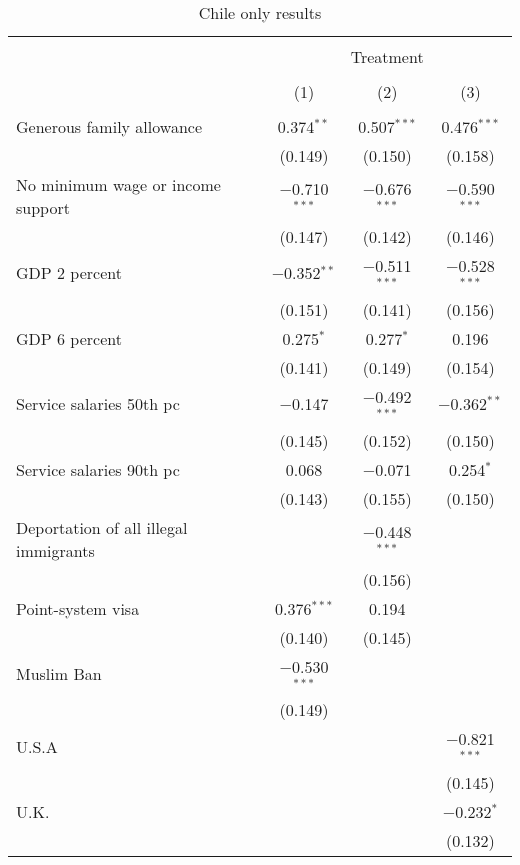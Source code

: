 
\begin{table}[!htbp] \centering 
  \caption{Chile only results} 
  \label{tab:chile} 
\begin{tabular}{@{\extracolsep{5pt}}lccc} 
\\[-1.8ex]\hline 
\hline \\[-1.8ex] 
 & \multicolumn{3}{c}{Treatment} \\ 
\cline{2-4} 
\\[-1.8ex] & (1) & (2) & (3)\\ 
\hline \\[-1.8ex] 
 Generous family allowance & 0.374$^{**}$ & 0.507$^{***}$ & 0.476$^{***}$ \\ 
  & (0.149) & (0.150) & (0.158) \\ 
  No minimum wage or income support & $-$0.710$^{***}$ & $-$0.676$^{***}$ & $-$0.590$^{***}$ \\ 
  & (0.147) & (0.142) & (0.146) \\ 
  GDP 2 percent & $-$0.352$^{**}$ & $-$0.511$^{***}$ & $-$0.528$^{***}$ \\ 
  & (0.151) & (0.141) & (0.156) \\ 
  GDP 6 percent & 0.275$^{*}$ & 0.277$^{*}$ & 0.196 \\ 
  & (0.141) & (0.149) & (0.154) \\ 
  Service salaries 50th pc & $-$0.147 & $-$0.492$^{***}$ & $-$0.362$^{**}$ \\ 
  & (0.145) & (0.152) & (0.150) \\ 
  Service salaries 90th pc & 0.068 & $-$0.071 & 0.254$^{*}$ \\ 
  & (0.143) & (0.155) & (0.150) \\ 
  Deportation of all illegal immigrants &  & $-$0.448$^{***}$ &  \\ 
  &  & (0.156) &  \\ 
  Point-system visa & 0.376$^{***}$ & 0.194 &  \\ 
  & (0.140) & (0.145) &  \\ 
  Muslim Ban & $-$0.530$^{***}$ &  &  \\ 
  & (0.149) &  &  \\ 
  U.S.A &  &  & $-$0.821$^{***}$ \\ 
  &  &  & (0.145) \\ 
  U.K. &  &  & $-$0.232$^{*}$ \\ 
  &  &  & (0.132) \\ 

\end{tabular}
\end{table}
